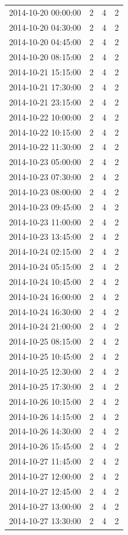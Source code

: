 \begin{tabular}{lrrr}
2014-10-20 00:00:00 & 2 & 4 & 2 \\
2014-10-20 04:30:00 & 2 & 4 & 2 \\
2014-10-20 04:45:00 & 2 & 4 & 2 \\
2014-10-20 08:15:00 & 2 & 4 & 2 \\
2014-10-21 15:15:00 & 2 & 4 & 2 \\
2014-10-21 17:30:00 & 2 & 4 & 2 \\
2014-10-21 23:15:00 & 2 & 4 & 2 \\
2014-10-22 10:00:00 & 2 & 4 & 2 \\
2014-10-22 10:15:00 & 2 & 4 & 2 \\
2014-10-22 11:30:00 & 2 & 4 & 2 \\
2014-10-23 05:00:00 & 2 & 4 & 2 \\
2014-10-23 07:30:00 & 2 & 4 & 2 \\
2014-10-23 08:00:00 & 2 & 4 & 2 \\
2014-10-23 09:45:00 & 2 & 4 & 2 \\
2014-10-23 11:00:00 & 2 & 4 & 2 \\
2014-10-23 13:45:00 & 2 & 4 & 2 \\
2014-10-24 02:15:00 & 2 & 4 & 2 \\
2014-10-24 05:15:00 & 2 & 4 & 2 \\
2014-10-24 10:45:00 & 2 & 4 & 2 \\
2014-10-24 16:00:00 & 2 & 4 & 2 \\
2014-10-24 16:30:00 & 2 & 4 & 2 \\
2014-10-24 21:00:00 & 2 & 4 & 2 \\
2014-10-25 08:15:00 & 2 & 4 & 2 \\
2014-10-25 10:45:00 & 2 & 4 & 2 \\
2014-10-25 12:30:00 & 2 & 4 & 2 \\
2014-10-25 17:30:00 & 2 & 4 & 2 \\
2014-10-26 10:15:00 & 2 & 4 & 2 \\
2014-10-26 14:15:00 & 2 & 4 & 2 \\
2014-10-26 14:30:00 & 2 & 4 & 2 \\
2014-10-26 15:45:00 & 2 & 4 & 2 \\
2014-10-27 11:45:00 & 2 & 4 & 2 \\
2014-10-27 12:00:00 & 2 & 4 & 2 \\
2014-10-27 12:45:00 & 2 & 4 & 2 \\
2014-10-27 13:00:00 & 2 & 4 & 2 \\
2014-10-27 13:30:00 & 2 & 4 & 2 \\

\end{tabular}
